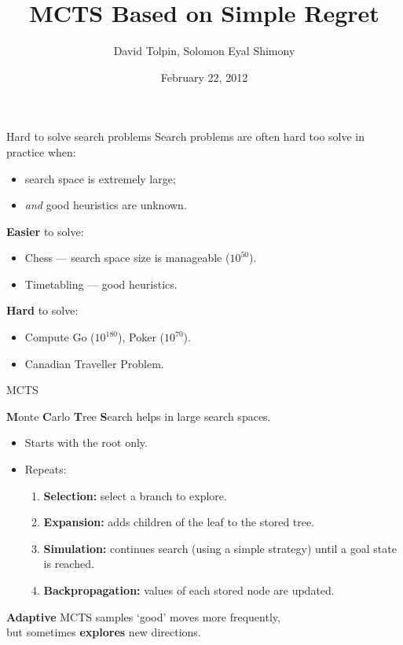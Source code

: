 \documentclass{beamer}
\title{MCTS Based on Simple Regret}
\author{David Tolpin, Solomon Eyal Shimony}
\institute{Ben-Gurion University of the Negev\\Beer Sheva, Israel}
\date{February 22, 2012}
\begin{document}
\begin{frame}
\titlepage
\end{frame}

\begin{frame}{Hard to solve search problems}
Search problems are often hard too solve in practice when:
\begin{itemize}
\item search space is extremely large;
\item {\it and} good heuristics are unknown.
\end{itemize}
\textbf{Easier} to solve:
\begin{itemize}
\item Chess --- search space size is manageable ($10^{50}$).
\item Timetabling --- good heuristics.
\end{itemize}
\textbf{Hard} to solve:
\begin{itemize}
\item Compute Go ($10^{180}$), Poker ($10^{70}$).
\item Canadian Traveller Problem.
\end{itemize}
\end{frame}

\begin{frame}{MCTS}

{\bf M}onte {\bf C}arlo {\bf T}ree {\bf S}earch helps in large search spaces.
\begin{itemize}
\item<+-> Starts with the root only.
\item<+-> Repeats:
  \begin{enumerate}
    \item \textbf{Selection:} select a branch to explore.
    \item<+-> \textbf{Expansion:} adds children of the leaf to the stored
      tree.
    \item<+-> \textbf{Simulation:} continues search (using a simple
      strategy) until a goal state is reached.
    \item<+-> \textbf{Backpropagation:} values of each stored node 
      are updated.
  \end{enumerate}
\end{itemize}
\vspace{1em}
\textbf{Adaptive} MCTS samples `good' moves more frequently,\\
but sometimes {\bf explores} new directions.
\end{frame}
\end{document}
